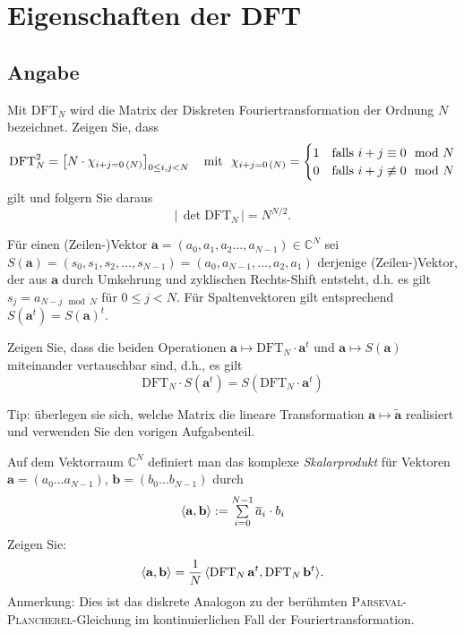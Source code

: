 \section*{Eigenschaften der DFT}

\makeatletter
\def\Ddots{\mathinner{\mkern1mu\raise\p@\vbox{\kern7\p@\hbox{.}}\mkern2mu\raise4\p@\hbox{.}\mkern2mu\raise7\p@\hbox{.}\mkern1mu}}
\makeatother

\subsection*{Angabe}
\begin{flushenum}
\item Mit $\text{DFT}_N$  wird die Matrix der Diskreten Fouriertransformation
	der Ordnung $N$ bezeichnet.  Zeigen Sie, dass
	\[
	\text{DFT}_N^2 = \begin{bmatrix} N \cdot \chi_{i+j=0\, (N)} \end{bmatrix}_{0 \leq i,j < N}~~~
	\text{mit}~~
	\chi_{i+j=0\,(N)} =
	\begin{cases}
	1 &\text{falls}~i+j \equiv 0 \mod N \cr
	0 &\text{falls}~i+j \not\equiv 0 \mod N
	\end{cases}
	\]
	gilt und folgern Sie daraus
	\[
	\left| \, \det \text{DFT}_N \, \right|= N^{N/2}.
	\]

\item Für einen (Zeilen-)Vektor $\mathbf{a} = (a_0,a_1,a_2\ldots,a_{N-1}) \in
	\mathbb{C}^N$ sei $S(\mathbf{a}) = (s_0,s_1,s_2,\ldots,s_{N-1})=
	(a_0,a_{N-1}, \ldots,a_2,a_1)$ derjenige (Zeilen-)Vektor, der aus
	$\mathbf{a}$ durch Umkehrung und zyklischen Rechts-Shift  entsteht,
	d.h. es gilt $s_j = a_{N-j \mod N}$ für $0 \leq j < N$.  Für
	Spaltenvektoren gilt entsprechend $S(\mathbf{a}^t) = S(\mathbf{a})^t$.
	
	Zeigen Sie, dass die beiden Operationen $\mathbf{a} \mapsto
	\text{DFT}_N \cdot \mathbf{a}^t$ und $\mathbf{a} \mapsto S(\mathbf{a})$
	miteinander vertauschbar sind, d.h., es gilt
	\[
	\text{DFT}_N\cdot S(\mathbf{a}^t) = S(\text{DFT}_N \cdot \mathbf{a}^t)
	\]
	
	Tip: überlegen sie sich, welche Matrix die lineare Transformation
	$\mathbf{a} \mapsto \widetilde{\mathbf{a}}$ realisiert und verwenden
	Sie den vorigen Aufgabenteil.
 \item
Auf dem Vektorraum $\mathbb{C}^N$ definiert man das komplexe
\emph{Skalarprodukt}  für Vektoren ${\mathbf a} = (a_0 \ldots a_{N-1})$,
${\mathbf b} = (b_0 \ldots b_{N-1})$ durch
\[
\begin{array}{l} \langle {\mathbf a},{\bf b} \rangle := \sum\limits^{N-1}_{i=0}
	\overline{a}_i \cdot b_i  \end{array}
\]
Zeigen Sie:
\[
\langle {\bf a},{\bf b} \rangle = \frac{1}{N} \, \langle \text{DFT}_N \,{\bf a}^t,   \text{DFT}_N \,{\bf b}^t \rangle.
\]
Anmerkung: Dies ist das diskrete Analogon zu  der berühmten
\textsc{Parseval-Plancherel}-Gleichung im kontinuierlichen Fall der
Fouriertransformation.
\end{flushenum}


